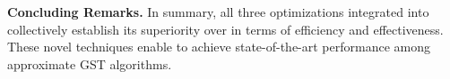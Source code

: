 
\textbf{Concluding Remarks.}
In summary, all three optimizations integrated into \ImprovPTS collectively establish its superiority over \Basic in terms of efficiency and effectiveness. These novel techniques enable \ImprovPTS to achieve state-of-the-art performance among approximate GST algorithms. 